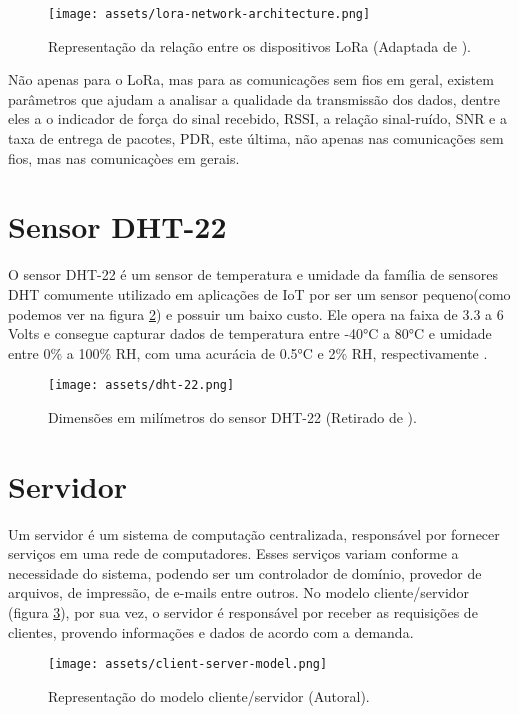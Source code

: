 \begin{figure}[H]
  \centering
  \texttt{[image: assets/lora-network-architecture.png]} 
  \caption{Representação da relação entre os dispositivos LoRa (Adaptada de \cite{lora2021architecture}).}
  \label{fig:end-nodes-gateways} 
\end{figure}

Não apenas para o LoRa, mas para as comunicações sem fios em geral, existem parâmetros que ajudam a analisar a qualidade da transmissão dos dados, dentre eles a o indicador de força do sinal recebido, RSSI, a relação sinal-ruído, SNR e a taxa de entrega de pacotes, PDR, este última, não apenas nas comunicações sem fios, mas nas comunicaçòes em gerais.

\section{Sensor DHT-22}
\label{fund:dht-22}
O sensor DHT-22 é um sensor de temperatura e umidade da família de sensores DHT comumente utilizado em aplicações de IoT por ser um sensor pequeno(como podemos ver na figura \ref{fig:dht-22}) e possuir um baixo custo. Ele opera na faixa de 3.3 a 6 Volts e consegue capturar dados de temperatura entre -40°C a 80°C e umidade entre 0\% a 100\% RH, com uma acurácia de 0.5°C e 2\% RH, respectivamente \cite{datasheetDHT22}.

\begin{figure}[H]
  \centering
  \texttt{[image: assets/dht-22.png]} 
  \caption{Dimensões em milímetros do sensor DHT-22 (Retirado de \cite{datasheetDHT22}).}
  \label{fig:dht-22} 
\end{figure}

\section{Servidor}
\label{fund:servidor}
Um servidor é um sistema de computação centralizada, responsável por fornecer serviços em uma rede de computadores. Esses serviços variam conforme a necessidade do sistema, podendo ser um controlador de domínio, provedor de arquivos, de impressão, de e-mails entre outros. No modelo cliente/servidor (figura \ref{fig:client-server-model}), por sua vez, o servidor é responsável por receber as requisições de clientes, provendo informações e dados de acordo com a demanda.

\begin{figure}[H]
  \centering
  \texttt{[image: assets/client-server-model.png]} 
  \caption{Representação do modelo cliente/servidor (Autoral).}
  \label{fig:client-server-model} 
\end{figure}

